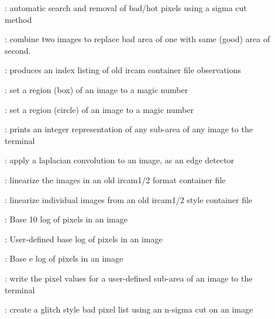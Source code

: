 \begin{description}
\item []: automatic search and removal of
bad/hot pixels using a sigma cut method

\item []: combine two images to replace bad
area of one with same (good) area of second.

\item []: produces an index listing of old {\sc
ircam} container file observations

\item []: set a region (box) of an image to a
magic number

\item []: set a region (circle) of an image to
a magic number

\item []: prints an integer representation of any
sub-area of any image to the terminal


\item []: apply a laplacian convolution to an
image, as an edge detector

\item []: linearize the images in an old {\sc
ircam1/2} format container file

\item []: linearize individual
images from an old {\sc ircam1/2} style container file

\item []: Base 10 log of pixels in an image

\item []: User-defined base log of pixels in an image

\item []: Base e log of pixels in an image

\item []: write the pixel values for a user-defined
sub-area of an image to the terminal

\item []: create a glitch style bad pixel
list using an n-sigma cut on an image


\end{description}
